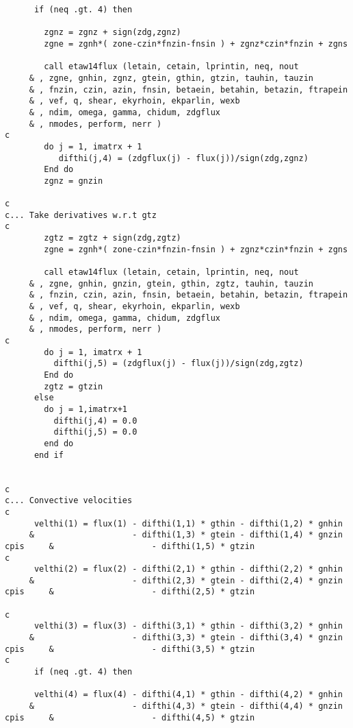 \begin{verbatim}
      if (neq .gt. 4) then

        zgnz = zgnz + sign(zdg,zgnz)
        zgne = zgnh*( zone-czin*fnzin-fnsin ) + zgnz*czin*fnzin + zgns

        call etaw14flux (letain, cetain, lprintin, neq, nout
     & , zgne, gnhin, zgnz, gtein, gthin, gtzin, tauhin, tauzin
     & , fnzin, czin, azin, fnsin, betaein, betahin, betazin, ftrapein
     & , vef, q, shear, ekyrhoin, ekparlin, wexb
     & , ndim, omega, gamma, chidum, zdgflux
     & , nmodes, perform, nerr )
c
        do j = 1, imatrx + 1
           difthi(j,4) = (zdgflux(j) - flux(j))/sign(zdg,zgnz)
        End do
        zgnz = gnzin

c
c... Take derivatives w.r.t gtz
c
        zgtz = zgtz + sign(zdg,zgtz)
        zgne = zgnh*( zone-czin*fnzin-fnsin ) + zgnz*czin*fnzin + zgns

        call etaw14flux (letain, cetain, lprintin, neq, nout
     & , zgne, gnhin, gnzin, gtein, gthin, zgtz, tauhin, tauzin
     & , fnzin, czin, azin, fnsin, betaein, betahin, betazin, ftrapein
     & , vef, q, shear, ekyrhoin, ekparlin, wexb
     & , ndim, omega, gamma, chidum, zdgflux
     & , nmodes, perform, nerr )
c
        do j = 1, imatrx + 1
          difthi(j,5) = (zdgflux(j) - flux(j))/sign(zdg,zgtz)
        End do
        zgtz = gtzin
      else 
        do j = 1,imatrx+1
          difthi(j,4) = 0.0
          difthi(j,5) = 0.0
        end do
      end if
           

c
c... Convective velocities
c
      velthi(1) = flux(1) - difthi(1,1) * gthin - difthi(1,2) * gnhin
     &                    - difthi(1,3) * gtein - difthi(1,4) * gnzin
cpis     &                    - difthi(1,5) * gtzin 
c
      velthi(2) = flux(2) - difthi(2,1) * gthin - difthi(2,2) * gnhin
     &                    - difthi(2,3) * gtein - difthi(2,4) * gnzin
cpis     &                    - difthi(2,5) * gtzin 

c
      velthi(3) = flux(3) - difthi(3,1) * gthin - difthi(3,2) * gnhin
     &                    - difthi(3,3) * gtein - difthi(3,4) * gnzin
cpis     &                    - difthi(3,5) * gtzin
c
      if (neq .gt. 4) then 

      velthi(4) = flux(4) - difthi(4,1) * gthin - difthi(4,2) * gnhin
     &                    - difthi(4,3) * gtein - difthi(4,4) * gnzin
cpis     &                    - difthi(4,5) * gtzin



\end{verbatim}
